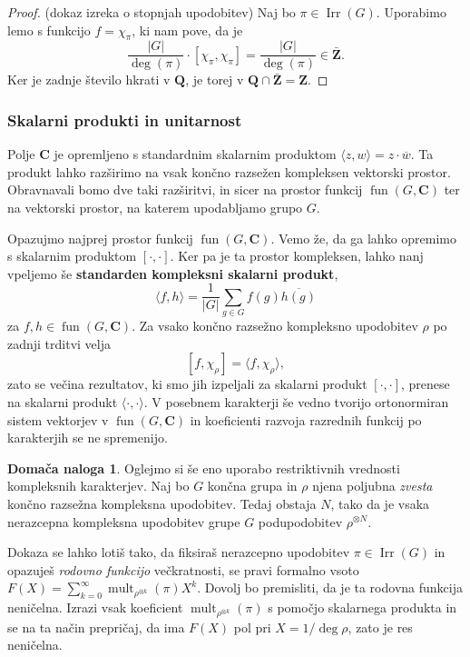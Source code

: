 \documentclass[11pt]{book}
\def\ZZ{\mathbf{Z}}
\def\QQ{\mathbf{Q}}
\def\CC{\mathbf{C}}
\DeclareMathOperator\mult{mult}
\DeclareMathOperator\Irr{Irr}
\DeclareMathOperator\fun{fun}
\def\definicija{\color{rdeca}\bf}
\theoremstyle{definition}
\theoremstyle{zgled}
\theoremstyle{zgledbrezstevilke}
\theoremstyle{odprtproblem}
\theoremstyle{domacanaloga}
\newtheorem{domacanaloga}[theorem]{Domača naloga}
\newenvironment{dokaz}
    {\color{siva}\begin{proof}}
    {\end{proof}}
\theoremstyle{izrek}
\begin{document}
    \begin{dokaz}(dokaz izreka o stopnjah upodobitev)
    Naj bo $\pi \in \Irr(G)$. Uporabimo lemo s funkcijo $f = \chi_{\pi}$, ki nam pove, da je 
    \[
        \frac{|G|}{\deg(\pi)} \cdot [ \chi_{\pi}, \chi_{\pi} ] = \frac{|G|}{\deg(\pi)} \in \bar{\ZZ}.
    \]
    Ker je zadnje število hkrati v $\QQ$, je torej v $\QQ \cap \bar{\ZZ} = \ZZ$.
    \end{dokaz}

\subsubsection{Skalarni produkti in unitarnost}

Polje $\CC$ je opremljeno s standardnim skalarnim produktom $\langle z, w \rangle = z \cdot \overline{w}$. Ta produkt lahko razširimo na vsak končno razsežen kompleksen vektorski prostor. Obravnavali bomo dve taki razširitvi, in sicer na prostor funkcij $\fun(G,\CC)$ ter na vektorski prostor, na katerem upodabljamo grupo $G$.

Opazujmo najprej prostor funkcij $\fun(G,\CC)$. Vemo že, da ga lahko opremimo s skalarnim produktom $[\cdot, \cdot]$. Ker pa je ta prostor kompleksen, lahko nanj vpeljemo še {\definicija standarden kompleksni skalarni produkt},
\[
    \langle f, h \rangle = \frac{1}{|G|} \sum_{g \in G} f(g) \overline{h(g)}
\]
za $f,h \in \fun(G,\CC)$. Za vsako končno razsežno kompleksno upodobitev $\rho$  po zadnji trditvi velja
\[
    [f, \chi_{\rho}] = \langle f, \chi_{\rho} \rangle,
\]
zato se večina rezultatov, ki smo jih izpeljali za skalarni produkt $[\cdot, \cdot]$, prenese na skalarni produkt $\langle \cdot, \cdot \rangle$. V posebnem  karakterji še vedno tvorijo ortonormiran sistem vektorjev v $\fun(G,\CC)$ in koeficienti razvoja razrednih funkcij po karakterjih se ne spremenijo.

\begin{domacanaloga}
Oglejmo si še eno uporabo restriktivnih vrednosti kompleksnih karakterjev. Naj bo $G$ končna grupa in $\rho$ njena poljubna \emph{zvesta} končno razsežna kompleksna upodobitev. Tedaj obstaja $N$, tako da je vsaka nerazcepna kompleksna upodobitev grupe $G$ podupodobitev $\rho^{\otimes N}$. 

Dokaza se lahko lotiš tako, da fiksiraš nerazcepno upodobitev $\pi \in \Irr(G)$ in opazuješ \emph{rodovno funkcijo} večkratnosti, se pravi formalno vsoto $F(X) = \sum_{k = 0}^{\infty} \mult_{\rho^{\otimes k}}(\pi) X^k$. Dovolj bo premisliti, da je ta rodovna funkcija neničelna. Izrazi vsak koeficient $\mult_{\rho^{\otimes k}}(\pi)$ s pomočjo skalarnega produkta in se na ta način prepričaj, da ima $F(X)$ pol pri $X = 1/\deg \rho$, zato je res neničelna.
\end{domacanaloga}
\end{document}
